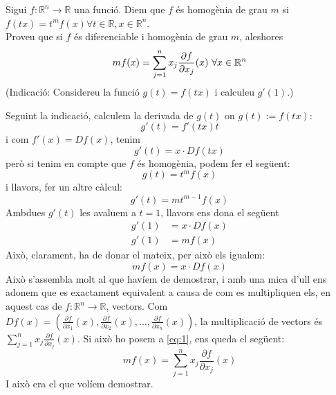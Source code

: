 \documentclass[a4paper, 12pt]{article}
\begin{document}
    \setcounter{numex}{29}
    \begin{exercici}
        Sigui $f: \mathbb{R}^n \to \mathbb{R}$ una funció. Diem que $f$ és homogènia de grau $m$ si
        $f(tx) = t^m f(x) \forall t \in \mathbb{R}, x \in \mathbb{R}^n$.\\
        Proveu que si $f$ és diferenciable i homogènia de grau $m$, aleshores
        \begin{displaymath}
            mf(x) = \sum\limits_{j=1}^{n} x_j \frac{\partial f}{\partial x_j}(x)\hbox{ }\forall x \in \mathbb{R}^n
        \end{displaymath}
        (Indicació: Considereu la funció $g(t) = f(tx)$ i calculeu $g'(1)$.)
    \end{exercici}
    \begin{solucio}
        Seguint la indicació, calculem la derivada de $g(t)$ on $g(t) := f(tx)$:
        \begin{displaymath}
            g'(t) = f'(tx)t
        \end{displaymath}
        i com $f'(x) = Df(x)$, tenim 
        \begin{displaymath}
            g'(t) = x \cdot Df(tx)
        \end{displaymath}
        però si tenim en compte que $f$ és homogènia, podem fer el següent:
        \begin{displaymath}
            g(t) = t^m f(x)
        \end{displaymath}
        i llavors, fer un altre càlcul:
        \begin{displaymath}
            g'(t) = mt^{m-1}f(x)
        \end{displaymath}
        Ambdues $g'(t)$ les avaluem a $t = 1$, llavors ens dona el següent
        \begin{displaymath}
            \begin{split}
                g'(1) &= x \cdot Df(x)\\
                g'(1) &= m f(x)
            \end{split}
        \end{displaymath}
        Això, clarament, ha de donar el mateix, per això els igualem:
        \begin{equation}
            m f(x) = x\cdot Df(x)
            \label{eq:1}
        \end{equation}
        Això s'assembla molt al que havíem de demostrar, i amb una mica d'ull ens adonem que es
        exactament equivalent a causa de com es multipliquen els, en aquest cas de $f: \mathbb{R}^n\to\mathbb{R}$,
        vectors. Com $Df(x) = \left(\frac{\partial f}{\partial x_1}(x), \frac{\partial f}{\partial x_2}(x), \dots, \frac{\partial f}{\partial x_n}(x)\right)$,
        la multiplicació de vectors és $\sum\limits_{j=1}^{n} x_j \frac{\partial f}{\partial x_j}(x)$.
        Si això ho posem a \eqref{eq:1}, ens queda el següent:
        \begin{displaymath}
            mf(x) = \sum\limits_{j=1}^{n} x_j \frac{\partial f}{\partial x_j}(x)
        \end{displaymath}
        I això era el que volíem demostrar.
    \end{solucio}
    
\end{document}

